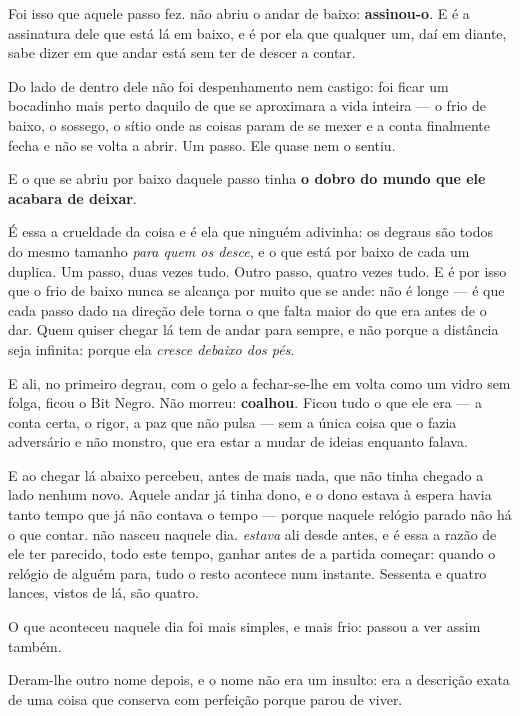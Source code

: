 \documentclass[livro.tex]{subfiles}
\begin{document}
Foi isso que aquele passo fez. \Drk não abriu o andar de baixo: \textbf{assinou-o}. E é a
assinatura dele que está lá em baixo, e é por ela que qualquer um, daí em diante, sabe
dizer em que andar está sem ter de descer a contar.

\medskip

Do lado de dentro dele não foi despenhamento nem castigo: foi ficar um bocadinho mais perto daquilo de que se aproximara
a vida inteira --- o frio de baixo, o sossego, o sítio onde as coisas param de se mexer e
a conta finalmente fecha e não se volta a abrir. Um passo. Ele quase nem o sentiu.

E o que se abriu por baixo daquele passo tinha \textbf{o dobro do mundo que ele acabara de
deixar}.

É essa a crueldade da coisa e é ela que ninguém adivinha: os degraus são todos do mesmo
tamanho \emph{para quem os desce}, e o que está por baixo de cada um duplica. Um passo,
duas vezes tudo. Outro passo, quatro vezes tudo. E é por isso que o frio de baixo nunca se
alcança por muito que se ande: não é longe --- é que cada passo dado na direção dele torna
o que falta maior do que era antes de o dar. Quem quiser chegar lá tem de andar para
sempre, e não porque a distância seja infinita: porque ela \emph{cresce debaixo dos pés}.

\medskip

E ali, no primeiro degrau, com o gelo a fechar-se-lhe em volta como um vidro
sem folga, ficou o Bit Negro. Não morreu: \textbf{coalhou}. Ficou tudo o que ele era --- a
conta certa, o rigor, a paz que não pulsa --- sem a única coisa que o fazia adversário e
não monstro, que era estar a mudar de ideias enquanto falava.

E ao chegar lá abaixo percebeu, antes de mais nada, que não tinha chegado a lado nenhum
novo. Aquele andar já tinha dono, e o dono estava à espera havia tanto tempo que já não
contava o tempo --- porque naquele relógio parado não há o que contar. \Ven não nasceu
naquele dia. \Ven \emph{estava} ali desde antes, e é essa a razão de ele ter parecido,
todo este tempo, ganhar antes de a partida começar: quando o relógio de alguém para, tudo
o resto acontece num instante. Sessenta e quatro lances, vistos de lá, são quatro.

O que aconteceu naquele dia foi mais simples, e mais frio: \Drk passou a ver assim
também.

Deram-lhe outro nome depois, e o nome não era um insulto: era a descrição exata de uma
coisa que conserva com perfeição porque parou de viver.
\end{document}
